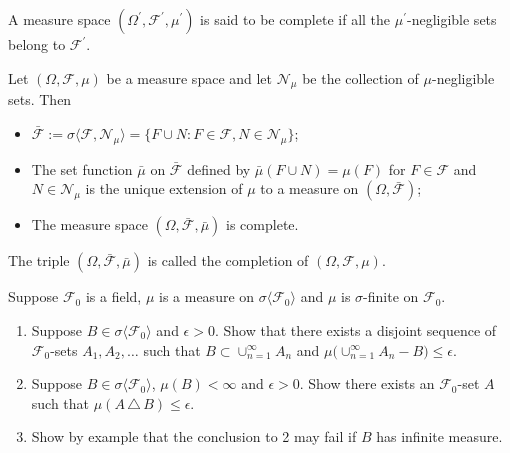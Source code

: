 \begin{definition}[{\bf Complete}]
A measure space $(\Omega^\prime, \mathcal F^\prime, \mu^\prime)$ is said to be complete if all the $\mu^\prime$-negligible sets belong to $\mathcal F^\prime$.
\end{definition}

\begin{theorem}
Let $(\Omega,\mathcal F, \mu)$ be a measure space and let $\mathcal N_\mu$ be the collection of $\mu$-negligible sets.
Then
\begin{itemize}
\item $\bar {\mathcal F}:= \sigma\langle \mathcal F, \mathcal N_\mu\rangle = \{F\cup N: F\in \mathcal F, N\in \mathcal N_\mu  \}$;
\item The set function $\bar \mu$ on $\bar{\mathcal F}$ defined by $\bar\mu(F\cup N)= \mu(F)$ for $F\in\mathcal F$ and $N\in \mathcal N_\mu$ is the unique extension of $\mu$ to a measure on $(\Omega, \bar{\mathcal F})$;
\item The measure space $(\Omega, \bar{\mathcal F}, \bar \mu)$ is complete.
\end{itemize}
The triple $(\Omega, \bar{\mathcal F}, \bar \mu)$ is called the {completion} of  $(\Omega, \mathcal F, \mu)$.
\end{theorem}









\begin{exercise}
\label{l1}
Suppose  $\mathcal F_0$ is a field, $\mu$ is a measure on $\sigma\langle \mathcal F_0\rangle$ and $\mu$ is $\sigma$-finite on $\mathcal F_0$.
\begin{enumerate}
\item
Suppose $B\in \sigma\langle\mathcal F_0\rangle$ and $\epsilon>0$. Show that there exists a disjoint sequence of $\mathcal F_0$-sets $A_1, A_2,\ldots$ such that $B\subset \cup_{n=1}^\infty A_n$ and $ \mu\bigl( \cup_{n=1}^\infty A_n -
 B\bigr)\leq \epsilon$.
 \item Suppose $B\in \sigma\langle\mathcal F_0\rangle$, $\mu(B)<\infty$ and $\epsilon>0$. Show there exists an $\mathcal F_0$-set $A$ such that $\mu(A \,\triangle\, B)\leq \epsilon$.
\item Show by example that the conclusion to 2 may fail if $B$ has infinite measure.
 \end{enumerate}
\end{exercise}


